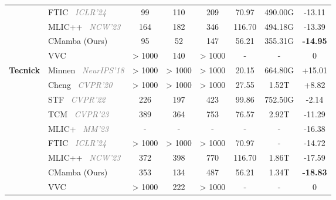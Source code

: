 \begin{table*}[t]
\begin{tabular}{clcccccc}
\multicolumn{1}{c}{}  & FTIC~\cite{li2024frequency} \textcolor{gray}{\textit{ICLR'24}}   &  99&  110&  209 &    70.97&   490.00G &  \cellcolor[HTML]{EFEFEF} -13.11\\
\multicolumn{1}{c}{}  & MLIC++~\cite{jiang2023mlicpp} \textcolor{gray}{\textit{NCW'23}}  &  164 &  182&  346&  116.70&  494.18G &  \cellcolor[HTML]{EFEFEF} -13.39 \\
\multicolumn{1}{c}{}  & CMamba (Ours)  & 95&  52&  147 &   56.21 &  355.31G &   \cellcolor[HTML]{EFEFEF} \textbf{-14.95}  \\ \cmidrule{2-8} 
\multicolumn{1}{c}{}  & VVC   & \textgreater{} 1000     &140   &\textgreater{} 1000     & -    & - & \cellcolor[HTML]{EFEFEF} 0     \\ \midrule \midrule 


\multicolumn{1}{c}{\multirow{9}{*}{\textbf{Tecnick}}}  & Minnen~\cite{minnen2018joint} \textcolor{gray}{\textit{NeurIPS'18}}& \textgreater{} 1000 & \textgreater{} 1000 & \textgreater{} 1000 & 20.15 & 664.80G & \cellcolor[HTML]{EFEFEF} +15.01 \\
\multicolumn{1}{c}{}  & Cheng~\cite{cheng2020learned} \textcolor{gray}{\textit{CVPR'20}}& \textgreater{} 1000 & \textgreater{} 1000 & \textgreater{} 1000 &  27.55  &  1.52T  & \cellcolor[HTML]{EFEFEF} +8.82 \\
\multicolumn{1}{c}{}  & STF~\cite{zou2022devil} \textcolor{gray}{\textit{CVPR'22}}   & 226 & 197 & 423 &  99.86     & 752.50G & \cellcolor[HTML]{EFEFEF} -2.14 \\
\multicolumn{1}{c}{}  & TCM~\cite{liu2023learned} \textcolor{gray}{\textit{CVPR'23}} & 389 & 364 & 753 &  76.57& 2.92T & \cellcolor[HTML]{EFEFEF} -11.29 \\
\multicolumn{1}{c}{}  & MLIC+~\cite{jiang2023mlic} \textcolor{gray}{\textit{MM'23}}      & - & - & - & - & - & \cellcolor[HTML]{EFEFEF} -16.38 \\
\multicolumn{1}{c}{}  & FTIC~\cite{li2024frequency} \textcolor{gray}{\textit{ICLR'24}}   & \textgreater{} 1000 & \textgreater{} 1000 & \textgreater{} 1000 &    70.97&  -  & \cellcolor[HTML]{EFEFEF} -14.72 \\
\multicolumn{1}{c}{}  & MLIC++~\cite{jiang2023mlicpp} \textcolor{gray}{\textit{NCW'23}}  & 372 & 398 & 770 &  116.70&  1.86T & \cellcolor[HTML]{EFEFEF} -17.59 \\
\multicolumn{1}{c}{}  & CMamba (Ours)  & 353 & 134 & 487 &   56.21 & 1.34T & \cellcolor[HTML]{EFEFEF} \textbf{-18.83}  \\ \cmidrule{2-8}
\multicolumn{1}{c}{}  & VVC   & \textgreater{} 1000 & 222 & \textgreater{} 1000 & -    & - & \cellcolor[HTML]{EFEFEF} 0     \\ \midrule \midrule 



\end{tabular}
\end{table*}
